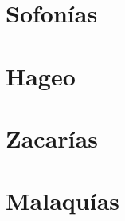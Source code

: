 \chapter{Sofonías}
\begin{multicols}{2}
  \raggedcolumns
  \parskip=0pt \relax
  
\end{multicols}

\chapter{Hageo}
\begin{multicols}{2}
  \raggedcolumns
  \parskip=0pt \relax
  
\end{multicols}

\chapter{Zacarías}
\begin{multicols}{2}
  \raggedcolumns
  \parskip=0pt \relax
  
\end{multicols}

\chapter{Malaquías}
\begin{multicols}{2}
  \raggedcolumns
  \parskip=0pt \relax
  
\end{multicols}

\newpage

\pagestyle{empty}

